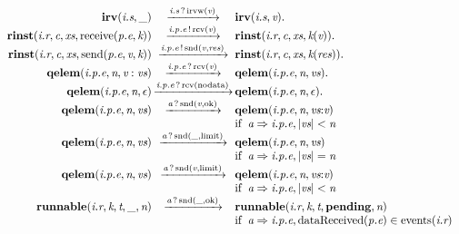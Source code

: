 \[\begin{array}{r@{}c@{}llllll}
\\\Pfact{\Tstep{\Tirv{\Ts{\Tvar{S}}{\Tvar{I}}}{\_}}{\Thear{\Ts{\Tvar{S}}{\Tvar{I}}}{\Tirvw{\Tvar{V}}}}{\Tirv{\Ts{\Tvar{S}}{\Tvar{I}}}{\Tvar{V}}}}
\\\Pfact{\Tstep{\Trinst{\Tr{\Tvar{R}}{\Tvar{I}}}{\Tvar{C}}{\Tvar{Xs}}{\TrteReceive{\Te{\Tvar{E}}{\Tvar{P}}}{\Tvar{K}}}}{\Tsay{\Tep{\Tvar{E}}{\Tvar{P}}{\Tvar{I}}}{\Trcv{\Tvar{V}}}}{\Trinst{\Tr{\Tvar{R}}{\Tvar{I}}}{\Tvar{C}}{\Tvar{Xs}}{\Tap{\Tvar{K}}{\Tvar{V}}}}}
\\\Pfact{\Tstep{\Trinst{\Tr{\Tvar{R}}{\Tvar{I}}}{\Tvar{C}}{\Tvar{Xs}}{\TrteSend{\Te{\Tvar{E}}{\Tvar{P}}}{\Tvar{V}}{\Tvar{K}}}}{\Tsay{\Tep{\Tvar{E}}{\Tvar{P}}{\Tvar{I}}}{\Tsnd{\Tvar{V}}{\Tvar{Res}}}}{\Trinst{\Tr{\Tvar{R}}{\Tvar{I}}}{\Tvar{C}}{\Tvar{Xs}}{\Tap{\Tvar{K}}{\Tvar{Res}}}}}
\\\Pfact{\Tstep{\Tqelem{\Tep{\Tvar{E}}{\Tvar{P}}{\Tvar{I}}}{\Tvar{N}}{\Tcons{\Tvar{V}}{\Tvar{Vs}}}}{\Thear{\Tep{\Tvar{E}}{\Tvar{P}}{\Tvar{I}}}{\Trcv{\Tvar{V}}}}{\Tqelem{\Tep{\Tvar{E}}{\Tvar{P}}{\Tvar{I}}}{\Tvar{N}}{\Tvar{Vs}}}}
\\\Pfact{\Tstep{\Tqelem{\Tep{\Tvar{E}}{\Tvar{P}}{\Tvar{I}}}{\Tvar{N}}{\Teps}}{\Thear{\Tep{\Tvar{E}}{\Tvar{P}}{\Tvar{I}}}{\Trcv{\Tnodata}}}{\Tqelem{\Tep{\Tvar{E}}{\Tvar{P}}{\Tvar{I}}}{\Tvar{N}}{\Teps}}}
\\\Prule{\Tstep{\Tqelem{\Tep{\Tvar{E}}{\Tvar{P}}{\Tvar{I}}}{\Tvar{N}}{\Tvar{Vs}}}{\Thear{\Tvar{A}}{\Tsnd{\Tvar{V}}{\Tok}}}{\Tqelem{\Tep{\Tvar{E}}{\Tvar{P}}{\Tvar{I}}}{\Tvar{N}}{\Tseq{\Tvar{Vs}}{\Tvar{V}}}}}{\Tconnect{\Tvar{A}}{\Tep{\Tvar{E}}{\Tvar{P}}{\Tvar{I}}},\Tless{\Tlength{\Tvar{Vs}}}{\Tvar{N}}}
\\\Prule{\Tstep{\Tqelem{\Tep{\Tvar{E}}{\Tvar{P}}{\Tvar{I}}}{\Tvar{N}}{\Tvar{Vs}}}{\Thear{\Tvar{A}}{\Tsnd{\_}{\Tlimit}}}{\Tqelem{\Tep{\Tvar{E}}{\Tvar{P}}{\Tvar{I}}}{\Tvar{N}}{\Tvar{Vs}}}}{\Tconnect{\Tvar{A}}{\Tep{\Tvar{E}}{\Tvar{P}}{\Tvar{I}}},\Tequal{\Tlength{\Tvar{Vs}}}{\Tvar{N}}}
\\\Prule{\Tstep{\Tqelem{\Tep{\Tvar{E}}{\Tvar{P}}{\Tvar{I}}}{\Tvar{N}}{\Tvar{Vs}}}{\Thear{\Tvar{A}}{\Tsnd{\Tvar{V}}{\Tlimit}}}{\Tqelem{\Tep{\Tvar{E}}{\Tvar{P}}{\Tvar{I}}}{\Tvar{N}}{\Tseq{\Tvar{Vs}}{\Tvar{V}}}}}{\Tconnect{\Tvar{A}}{\Tep{\Tvar{E}}{\Tvar{P}}{\Tvar{I}}},\Tless{\Tlength{\Tvar{Vs}}}{\Tvar{N}}}
\\\Prule{\Tstep{\Trunnable{\Tr{\Tvar{R}}{\Tvar{I}}}{\Tvar{K}}{\Tvar{T}}{\_}{\Tvar{N}}}{\Thear{\Tvar{A}}{\Tsnd{\_}{\Tok}}}{\Trunnable{\Tr{\Tvar{R}}{\Tvar{I}}}{\Tvar{K}}{\Tvar{T}}{\Tpending}{\Tvar{N}}}}{\Tconnect{\Tvar{A}}{\Tep{\Tvar{E}}{\Tvar{P}}{\Tvar{I}}},\Tmember{\TdataReceived{\Te{\Tvar{E}}{\Tvar{P}}}}{\Tevents{\Tr{\Tvar{R}}{\Tvar{I}}}}}

\end{array}\]
